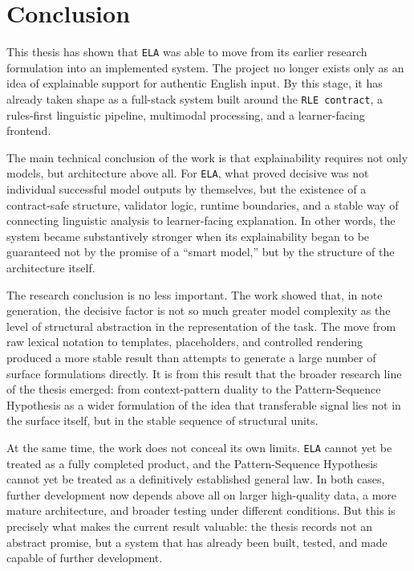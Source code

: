 \documentclass[12pt,a4paper,oneside]{report}
\begin{document}
\chapter{Conclusion}
This thesis has shown that \texttt{ELA} was able to move from its earlier research formulation into an implemented system. The project no longer exists only as an idea of explainable support for authentic English input. By this stage, it has already taken shape as a full-stack system built around the \texttt{RLE contract}, a rules-first linguistic pipeline, multimodal processing, and a learner-facing frontend.

The main technical conclusion of the work is that explainability requires not only models, but architecture above all. For \texttt{ELA}, what proved decisive was not individual successful model outputs by themselves, but the existence of a contract-safe structure, validator logic, runtime boundaries, and a stable way of connecting linguistic analysis to learner-facing explanation. In other words, the system became substantively stronger when its explainability began to be guaranteed not by the promise of a ``smart model,'' but by the structure of the architecture itself.

The research conclusion is no less important. The work showed that, in note generation, the decisive factor is not so much greater model complexity as the level of structural abstraction in the representation of the task. The move from raw lexical notation to templates, placeholders, and controlled rendering produced a more stable result than attempts to generate a large number of surface formulations directly. It is from this result that the broader research line of the thesis emerged: from context-pattern duality to the Pattern-Sequence Hypothesis as a wider formulation of the idea that transferable signal lies not in the surface itself, but in the stable sequence of structural units.

At the same time, the work does not conceal its own limits. \texttt{ELA} cannot yet be treated as a fully completed product, and the Pattern-Sequence Hypothesis cannot yet be treated as a definitively established general law. In both cases, further development now depends above all on larger high-quality data, a more mature architecture, and broader testing under different conditions. But this is precisely what makes the current result valuable: the thesis records not an abstract promise, but a system that has already been built, tested, and made capable of further development.
\end{document}
